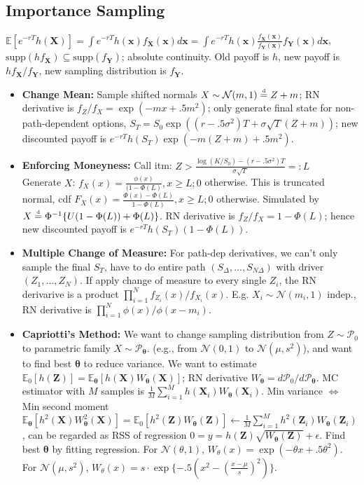 \documentclass[9pt, landscape]{article}
\newcommand\disteq{\stackrel{\mathclap{\normalfont\mbox{\tiny d}}}{=}}
\begin{document}
\begin{multicols*}{3}
	\subsection{Importance Sampling}
	$\mathbb{E}[e^{-rT}h(\bm{X})] = \int e^{-rT}h(\bm{x})f_{\bm{X}}(\bm{x})d \bm{x} = \int e^{-rT}h(\bm{x})\frac{f_{\bm{X}}(\bm{x})}{f_{\bm{Y}}(\bm{x})}f_{\bm{Y}}(\bm{x})d \bm{x}$, $\text{supp}(hf_{\bm{X}})\subseteq \text{supp}(f_{\bm{Y}})$; absolute continuity. Old payoff is $h$, new payoff is $hf_{\bm{X}}/f_{\bm{Y}}$, new sampling distribution is $f_{\bm{Y}}$.
	\begin{itemize}
	\item \textbf{Change Mean:} Sample shifted normals $X\sim \mathcal{N}(m, 1) \disteq Z+m$; RN derivative is $f_{Z}/f_{X}=\exp(-mx+.5m^2)$; only generate final state for non-path-dependent options, $S_T=S_0\exp((r-.5\sigma^2)T+\sigma\sqrt{T}(Z+m))$; new discounted payoff is $e^{-rT}h(S_T)\exp(-m(Z+m)+.5m^2)$.
	\item \textbf{Enforcing Moneyness:} Call itm: $Z>\frac{\log (K/S_0)-(r-.5\sigma^2)T}{\sigma \sqrt{T}}=:L$\\
	Generate $X$: $f_X(x) = \frac{\phi(x)}{(1-\Phi(L)}, x\geq L; 0$ otherwise. This is truncated normal, cdf $F_X(x)= \frac{\Phi(x)-\Phi(L)}{1-\Phi(L)}, x\geq L; 0$ otherwise. Simulated by $X\disteq \Phi^{-1}\{U(1-\Phi(L))+\Phi(L)\}$. RN derivative is $f_{Z}/f_{X}=1-\Phi(L)$; hence new discounted payoff is $e^{-rT}h(S_T)(1-\Phi(L))$.
	\item \textbf{Multiple Change of Measure:} For path-dep derivatives, we can't only sample the final $S_T$, have to do entire path $(S_{\Delta}, ..., S_{N\Delta})$ with driver $(Z_1,...,Z_N)$. If apply change of measure to every single $Z_i$, the RN derivarive is a product $\prod_{i=1}^N f_{Z_i}(x)/f_{X_i}(x)$. E.g. $X_i\sim \mathcal{N}(m_i, 1)$ indep., RN derivative is $\prod_{i=1}^N \phi(x)/\phi(x-m_i)$.
	\item \textbf{Capriotti's Method:} We want to change sampling distribution from $Z\sim\mathcal{P}_0$ to parametric family $X\sim\mathcal{P}_{\bm{\theta}}$. (e.g., from $\mathcal{N}(0,1)$ to $\mathcal{N}(\mu, s^2)$), and want to find best $\bm{\theta}$ to reduce variance. We want to estimate $\mathbb{E}_0[h(\bm{Z})]=\mathbb{E}_{\bm{\theta}}[h(\bm{X})W_{\bm{\theta}}(\bm{X})]$; RN derivative $W_{\bm{\theta}}=d \mathcal{P}_0/d \mathcal{P}_{\bm{\theta}}$. MC estimator with $M$ samples is $\frac{1}{M}\sum_{i=1}^Mh(\bm{X}_i)W_{\bm{\theta}}(\bm{X}_i)$. Min variance $\iff$ Min second moment $\mathbb{E}_{\bm{\theta}}[h^2(\bm{X})W^2_{\bm{\theta}}(\bm{X})]=\mathbb{E}_{0}[h^2(\bm{Z})W_{\bm{\theta}}(\bm{Z})]\gets \frac{1}{M}\sum_{i=1}^Mh^2(\bm{Z}_i)W_{\bm{\theta}}(\bm{Z}_i)$, can be regarded as RSS of regression $0 = y = h(\bm{Z})\sqrt{W_{\bm{\theta}}(\bm{Z})}+\epsilon$. Find best $\bm{\theta}$ by fitting regression. For $\mathcal{N}(\theta, 1)$, $W_{\theta}(x)=\exp(-\theta x+.5\theta^2)$. For $\mathcal{N}(\mu, s^2)$, $W_\theta(x) = s\cdot\exp\{-.5(x^2 - (\frac{x-\mu}{s})^2)\}$.\\

\end{itemize}
\end{multicols*}
\end{document}
